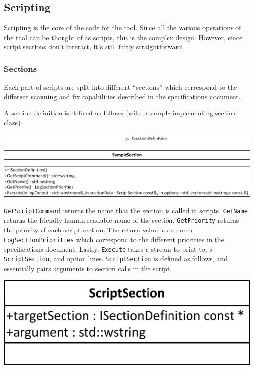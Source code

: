 \documentclass[letterpaper,12pt]{article}
\begin{document}
\subsection{Scripting}
Scripting is the core of the code for the tool.  Since all the various
operations of the tool can be thought of as scripts, this is the complex design.
However, since script sections don't interact, it's still fairly
straightforward.  

\subsubsection{Sections}
Each part of scripts are split into different ``sections'' which correspond to
the different scanning and fix capabilities described in the specifications
document.  

A section definition is defined as follows (with a sample implementing section
class):
\begin{center}\includegraphics{figures/ISectionDefinition.png}\end{center}

\verb|GetScriptCommand| returns the name that the section is called in scripts. 
\verb|GetName| returns the friendly human readable name of the section. 
\verb|GetPriority| returns the priority of each script section.  The return
value is an enum \verb|LogSectionPriorities| which correspond to the different
priorities in the specifications document.  Lastly, \verb|Execute| takes a
stream to print to, a \verb|ScriptSection|, and option lines. 
\verb|ScriptSection| is defined as follows, and essentially pairs arguments to
section calls in the script.
\begin{center}\includegraphics{figures/ScriptSection.png}\end{center}
\end{document}
